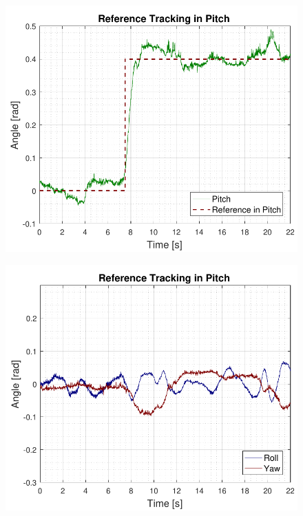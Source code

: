 \begin{minipage}{\linewidth}
    \begin{minipage}{0.46\linewidth}
        \begin{figure}[H]
            \includegraphics[scale=.55]{figures/AccepttestRefTrackPitch.pdf}
            \centering			
            \label{fig:AccepttestRefTrackPitch}
        \end{figure}
    \end{minipage}
    \hspace{0.03\linewidth}
    \begin{minipage}{0.46\linewidth}
        \begin{figure}[H]
            \includegraphics[scale=.55]{figures/AccepttestRefTrackPitchRollYaw.pdf}
            \centering
            \label{fig:AccepttestRefTrackPitchRollYaw}
        \end{figure}
    \end{minipage}
\end{minipage}


